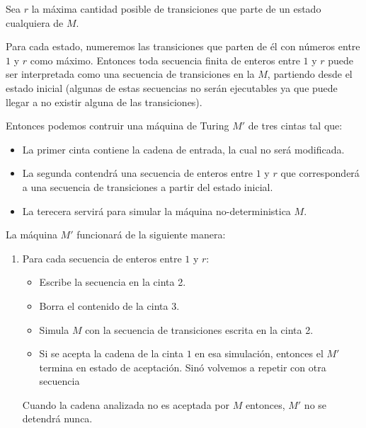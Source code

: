 \begin{demo}[0.8\textwidth]
  Sea \(r\) la máxima cantidad posible de transiciones que parte de un estado cualquiera de \(M\).

  Para cada estado, numeremos las transiciones que parten de él con números entre \(1\) y \(r\) como máximo. Entonces toda secuencia finita de enteros entre \(1\) y \(r\) puede ser interpretada como una secuencia de transiciones en la \(M\), partiendo desde el estado inicial (algunas de estas secuencias no serán ejecutables ya que puede llegar a no existir alguna de las transiciones).

  Entonces podemos contruir una máquina de Turing \(M'\) de tres cintas tal que:
  \begin{itemize}
    \item La primer cinta contiene la cadena de entrada, la cual no será modificada.
    \item La segunda contendrá una secuencia de enteros entre \(1\) y \(r\) que corresponderá a una secuencia de transiciones a partir del estado inicial.
    \item La terecera servirá para simular la máquina no-deterministica \(M\).
  \end{itemize}

  La máquina \(M'\) funcionará de la siguiente manera:
  \begin{enumerate}
    \item Para cada secuencia de enteros entre \(1\) y \(r\):
          \begin{itemize}
            \item Escribe la secuencia en la cinta 2.
            \item Borra el contenido de la cinta 3.
            \item Simula \(M\) con la secuencia de transiciones escrita en la cinta 2.
            \item Si se acepta la cadena de la cinta \(1\) en esa simulación, entonces el \(M'\) termina en estado de aceptación. Sinó volvemos a repetir con otra secuencia
          \end{itemize}
          Cuando la cadena analizada no es aceptada por \(M\) entonces, \(M'\) no se detendrá nunca.
  \end{enumerate}
\end{demo}


